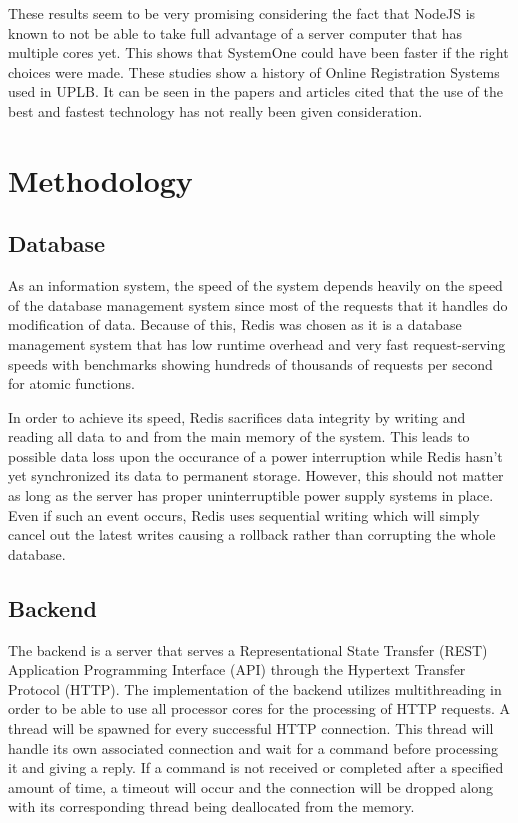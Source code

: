 \documentclass{sigchi}
\begin{document}
These results seem to be very promising considering the fact that NodeJS is known to not be able to take full advantage of a server computer that has multiple cores yet. This shows that SystemOne could have been faster if the right choices were made. These studies show a history of Online Registration Systems used in UPLB. It can be seen in the papers and articles cited that the use of the best and fastest technology has not really been given consideration.

\section{Methodology}

\subsection{Database}

As an information system, the speed of the system depends heavily on the speed of the database management system since most of the requests that it handles do modification of data. Because of this, Redis was chosen as it is a database management system that has low runtime overhead and very fast request-serving speeds with benchmarks showing hundreds of thousands of requests per second for atomic functions.

In order to achieve its speed, Redis sacrifices data integrity by writing and reading all data to and from the main memory of the system. This leads to possible data loss upon the occurance of a power interruption while Redis hasn't yet synchronized its data to permanent storage. However, this should not matter as long as the server has proper uninterruptible power supply systems in place. Even if such an event occurs, Redis uses sequential writing which will simply cancel out the latest writes causing a rollback rather than corrupting the whole database.

\subsection{Backend}

The backend is a server that serves a Representational State Transfer (REST) Application Programming Interface (API) through the Hypertext Transfer Protocol (HTTP). The implementation of the backend utilizes multithreading in order to be able to use all processor cores for the processing of HTTP requests. A thread will be spawned for every successful HTTP connection. This thread will handle its own associated connection and wait for a command before processing it and giving a reply. If a command is not received or completed after a specified amount of time, a timeout will occur and the connection will be dropped along with its corresponding thread being deallocated from the memory. 
\end{document}
